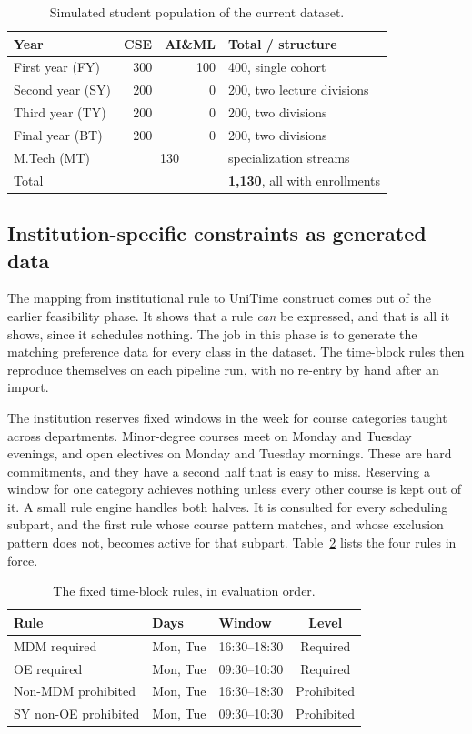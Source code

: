 \documentclass[journal]{IEEEtran}
\begin{document}
\begin{table}[t]
\centering
\caption{Simulated student population of the current dataset.}
\label{tab:population}
\footnotesize
\begin{tabular}{@{}lrrl@{}}
\toprule
Year & CSE & AI\&ML & Total / structure \\
\midrule
First year (FY) & 300 & 100 & 400, single cohort \\
Second year (SY) & 200 & 0 & 200, two lecture divisions \\
Third year (TY) & 200 & 0 & 200, two divisions \\
Final year (BT) & 200 & 0 & 200, two divisions \\
M.Tech (MT) & \multicolumn{2}{c}{130} & specialization streams \\
\midrule
Total & \multicolumn{2}{c}{} & \textbf{1{,}130}, all with enrollments \\
\bottomrule
\end{tabular}
\end{table}

\subsection{Institution-specific constraints as generated data}
The mapping from institutional rule to UniTime construct comes out of the earlier feasibility phase. It shows that a rule \emph{can} be expressed, and that is all it shows, since it schedules nothing. The job in this phase is to generate the matching preference data for every class in the dataset. The time-block rules then reproduce themselves on each pipeline run, with no re-entry by hand after an import.

The institution reserves fixed windows in the week for course categories taught across departments. Minor-degree courses meet on Monday and Tuesday evenings, and open electives on Monday and Tuesday mornings. These are hard commitments, and they have a second half that is easy to miss. Reserving a window for one category achieves nothing unless every other course is kept out of it. A small rule engine handles both halves. It is consulted for every scheduling subpart, and the first rule whose course pattern matches, and whose exclusion pattern does not, becomes active for that subpart. Table~\ref{tab:blocks} lists the four rules in force.

\begin{table}[t]
\centering
\caption{The fixed time-block rules, in evaluation order.}
\label{tab:blocks}
\footnotesize
\begin{tabular}{@{}lllc@{}}
\toprule
Rule & Days & Window & Level \\
\midrule
MDM required & Mon, Tue & 16:30--18:30 & Required \\
OE required & Mon, Tue & 09:30--10:30 & Required \\
Non-MDM prohibited & Mon, Tue & 16:30--18:30 & Prohibited \\
SY non-OE prohibited & Mon, Tue & 09:30--10:30 & Prohibited \\
\bottomrule
\end{tabular}
\end{table}
\end{document}
